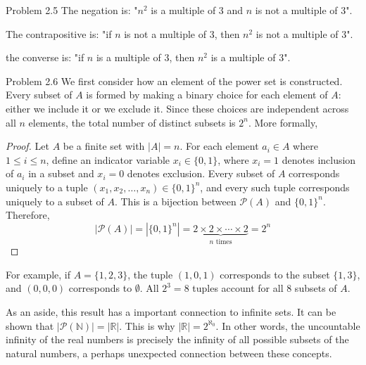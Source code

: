 \begin{sol}{Problem 2.5}
The negation is: "$n^2$ is a multiple of 3 and $n$ is not a multiple of 3". 

The contrapositive is: "if $n$ is not a multiple of 3, then $n^2$ is not a multiple of 3".

the converse is: "if $n$ is a multiple of 3, then $n^2$ is a multiple of 3".
\end{sol}

\begin{sol}{Problem 2.6}
We first consider how an element of the power set is constructed. Every subset of $A$ is formed by making a binary choice for each element of $A$: either we include it or we exclude it. Since these choices are independent across all $n$ elements, the total number of distinct subsets is $2^n$. More formally,

\begin{proof}
Let $A$ be a finite set with $|A| = n$. For each element $a_i \in A$ where $1 \leq i \leq n$, define an indicator variable $x_i \in \{0, 1\}$, where $x_i = 1$ denotes inclusion of $a_i$ in a subset and $x_i = 0$ denotes exclusion. Every subset of $A$ corresponds uniquely to a tuple $(x_1, x_2, \ldots, x_n) \in \{0,1\}^n$, and every such tuple corresponds uniquely to a subset of $A$. This is a bijection between $\mathcal{P}(A)$ and $\{0,1\}^n$. Therefore,
\[
|\mathcal{P}(A)| = |\{0,1\}^n| = \underbrace{2 \times 2 \times \cdots \times 2}_{n \text{ times}} = 2^n
\]
\end{proof}
For example, if $A = \{1, 2, 3\}$, the tuple $(1, 0, 1)$ corresponds to the 
subset $\{1, 3\}$, and $(0, 0, 0)$ corresponds to $\emptyset$. All $2^3 = 8$ 
tuples account for all $8$ subsets of $A$.

As an aside, this result has a important connection to infinite sets. It can be shown that $|\mathcal{P}(\mathbb{N})| = |\mathbb{R}|$. This is why $|\mathbb{R}| = 2^{\aleph_0}$. In other words, the uncountable infinity of the real numbers is precisely the infinity of all possible subsets of the natural numbers, a perhaps unexpected connection between these concepts.
\end{sol}

